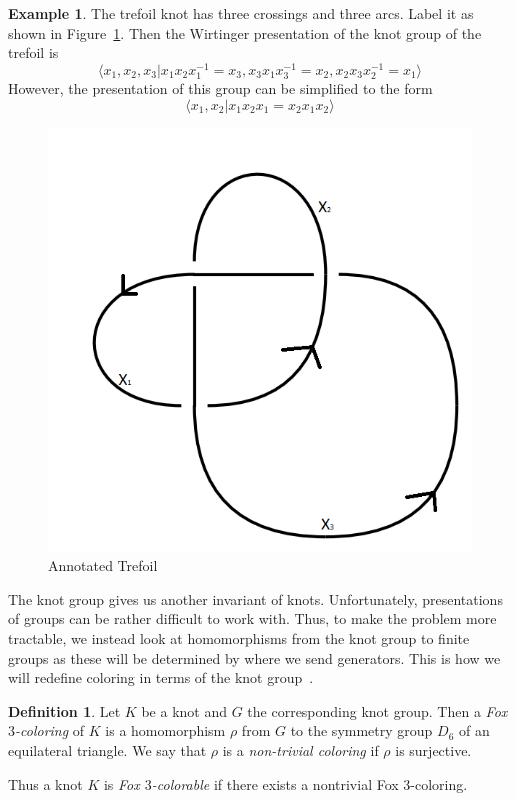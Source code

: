\documentclass[12pt]{amsart}
\theoremstyle{definition}
\newtheorem{definition}[theorem]{Definition}
\newtheorem{example}[theorem]{Example}
\theoremstyle{remark}
\numberwithin{equation}{section}
\newcommand{\ds}{.3}
\begin{document}
\begin{example}
  The trefoil knot has three crossings and three arcs. Label it as
  shown in Figure~\ref{fig:annotated-trefoil}. Then the Wirtinger presentation
  of the knot group of the trefoil is
  \[
    \langle x_1,x_2,x_3|x_1x_2x_1^{-1}=x_3,x_3x_1x_3^{-1}=x_2,x_2x_3x_2^{-1}=x_1\rangle
  \]
  However, the presentation of this group can be simplified to the
  form
  \[
    \langle x_1,x_2| x_1x_2x_1=x_2x_1x_2\rangle
  \]
\end{example}

\begin{figure}
  \includegraphics[scale=\ds]{annotated-trefoil}
  \caption{Annotated Trefoil}
  \label{fig:annotated-trefoil}
\end{figure}

The knot group gives us another invariant of knots. Unfortunately,
presentations of groups can be rather difficult to work with.
Thus, to make the problem more tractable, we instead look
at homomorphisms from the knot group to finite groups as these
will be determined by where we send generators. This is
how we will redefine coloring in terms of the knot group~\cite{quickfox}.

\begin{definition}
  Let $K$ be a knot and $G$ the corresponding knot group. Then a
  \textit{Fox $3$-coloring} of $K$ is a homomorphism $\rho$ from
  $G$ to the symmetry group $D_6$ of an equilateral triangle. We say that
  $\rho$ is a \textit{non-trivial coloring} if $\rho$ is surjective.

  Thus a knot $K$ is \textit{Fox $3$-colorable} if there exists a nontrivial
  Fox $3$-coloring.
\end{definition}
\end{document}
